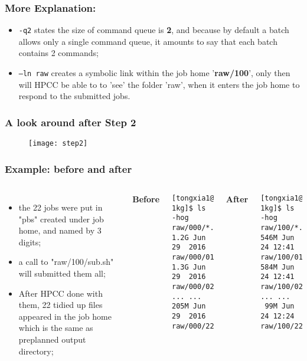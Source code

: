 \documentclass{beamer}
\begin{document}
\begin{frame}
\frametitle{More Explanation:}

\begin{itemize}
\item \texttt{-q2} states the size of command queue is \textbf{2}, and because by default a batch allows
only a single command queue, it amounts to say that each batch contains 2 commands;
\item \texttt{--ln raw} creates a symbolic link within the job home '\textbf{raw/100}', only then will HPCC be
able to to 'see' the folder 'raw', when it enters the job home to respond to the submitted jobs.
\end{itemize}
\end{frame}


\begin{frame}[fragile]
\frametitle{A look around after Step 2}
\begin{figure}
\texttt{[image: step2]}
\end{figure}
\end{frame}

\begin{frame}[fragile]
\frametitle{Example: before and after}
\begin{columns}[c] %

\begin{itemize}
\item the 22 jobs were put in "pbs" created under job home, and named by 3 digits;
\item a call to "raw/100/sub.sh" will submitted them all;
\item After HPCC done with them, 22 tidied up files appeared in the job home which is the same as preplanned output directory; 

\end{itemize}



\tiny
\textbf{Before}
\begin{verbatim}
[tongxia1@... 1kg]$ ls -hog raw/000/*.vcf.gz
1.2G Jun 29  2016 raw/000/01.vcf.gz
1.3G Jun 29  2016 raw/000/02.vcf.gz
... ...
205M Jun 29  2016 raw/000/22.vcf.gz
\end{verbatim}

\textbf{After}
\begin{verbatim}
[tongxia1@... 1kg]$ ls -hog raw/100/*.vcf.gz
546M Jun 24 12:41 raw/100/01.vcf.gz
584M Jun 24 12:41 raw/100/02.vcf.gz
... ...
 99M Jun 24 12:24 raw/100/22.vcf.gz
\end{verbatim}
\end{columns}
\end{frame}
\end{document}
